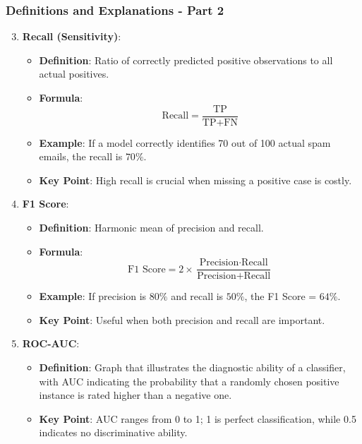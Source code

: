 \documentclass[aspectratio=169]{beamer}
\begin{document}
\begin{frame}[fragile]
    \frametitle{Definitions and Explanations - Part 2}
    \begin{enumerate}
        \setcounter{enumi}{2} %
        
        \item \textbf{Recall (Sensitivity)}:
        \begin{itemize}
            \item \textbf{Definition}: Ratio of correctly predicted positive observations to all actual positives.
            \item \textbf{Formula}:
            \begin{equation}
            \text{Recall} = \frac{\text{TP}}{\text{TP} + \text{FN}}
            \end{equation}
            \item \textbf{Example}: If a model correctly identifies 70 out of 100 actual spam emails, the recall is \(70\%\).
            \item \textbf{Key Point}: High recall is crucial when missing a positive case is costly.
        \end{itemize}
        
        \item \textbf{F1 Score}:
        \begin{itemize}
            \item \textbf{Definition}: Harmonic mean of precision and recall.
            \item \textbf{Formula}:
            \begin{equation}
            \text{F1 Score} = 2 \times \frac{\text{Precision} \cdot \text{Recall}}{\text{Precision} + \text{Recall}}
            \end{equation}
            \item \textbf{Example}: If precision is \(80\%\) and recall is \(50\%\), the F1 Score = \(64\%\).
            \item \textbf{Key Point}: Useful when both precision and recall are important.
        \end{itemize}
        
        \item \textbf{ROC-AUC}:
        \begin{itemize}
            \item \textbf{Definition}: Graph that illustrates the diagnostic ability of a classifier, with AUC indicating the probability that a randomly chosen positive instance is rated higher than a negative one.
            \item \textbf{Key Point}: AUC ranges from 0 to 1; 1 is perfect classification, while 0.5 indicates no discriminative ability.
        \end{itemize}
    \end{enumerate}
\end{frame}
\end{document}
